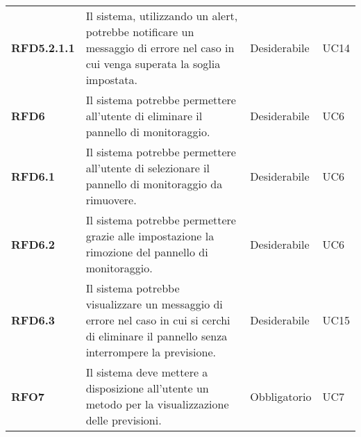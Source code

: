 \begin{longtable}[H]{>{\centering\bfseries}m{2cm} >{\centering}m{9cm} >{\centering}m{2.5cm} >{\centering\arraybackslash}m{2.5cm}}
  \textbf{RFD5.2.1.1} & Il sistema, utilizzando un alert, potrebbe notificare un messaggio di errore nel caso in cui venga superata la soglia impostata. & Desiderabile & UC14 \\
  \textbf{RFD6} & Il sistema potrebbe permettere all'utente di eliminare il pannello di monitoraggio. & Desiderabile & UC6 \\
  \textbf{RFD6.1} & Il sistema potrebbe permettere all'utente di selezionare il pannello di monitoraggio da rimuovere. & Desiderabile & UC6 \\
  \textbf{RFD6.2} & Il sistema potrebbe permettere grazie alle impostazione la rimozione del pannello di monitoraggio. & Desiderabile & UC6 \\
  \textbf{RFD6.3} & Il sistema potrebbe visualizzare un messaggio di errore nel caso in cui si cerchi di eliminare il pannello senza interrompere la previsione. & Desiderabile & UC15 \\
  \textbf{RFO7} & Il sistema deve mettere a disposizione all'utente un metodo per la visualizzazione delle previsioni. & Obbligatorio & UC7 \\


\end{longtable}

